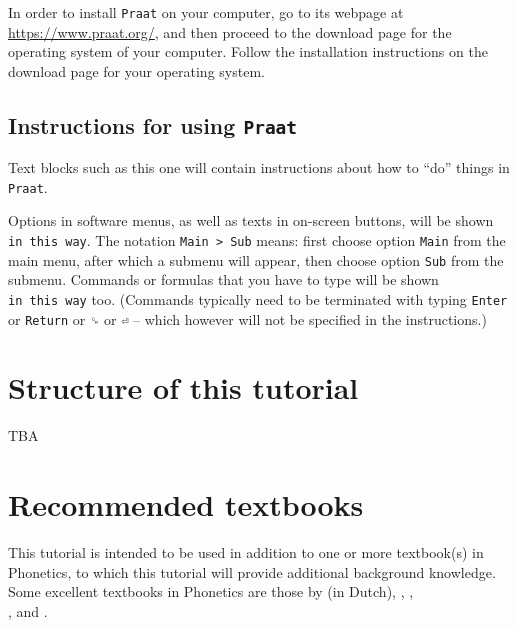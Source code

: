 \documentclass[
]{book}
\begin{document}
In order to install \texttt{Praat} on your computer, go to its webpage at \url{https://www.praat.org/}, and then proceed to the download page for the operating system of your computer. Follow the installation instructions on the download page for your operating system.

\label{tech-layout}
\subsection*{\texorpdfstring{Instructions for using \texttt{Praat}}{Instructions for using Praat}}\label{instructions-for-using-praat}

Text blocks such as this one will contain instructions about how to ``do'' things in \texttt{Praat}.

Options in software menus, as well as texts in on-screen buttons, will be shown \texttt{in\ this\ way}.
The notation \texttt{Main\ \textgreater{}\ Sub} means: first choose option \texttt{Main} from the main menu, after which a submenu will appear, then choose option \texttt{Sub} from the submenu.
Commands or formulas that you have to type will be shown \texttt{in\ this\ way} too. (Commands typically need to be terminated with typing \texttt{Enter} or \texttt{Return} or \texttt{␍} or \texttt{⏎} -- which however will not be specified in the instructions.)

\section*{Structure of this tutorial}\label{structure-of-this-tutorial}

TBA

\section*{Recommended textbooks}\label{recommended-textbooks}

This tutorial is intended to be used in addition to one or more textbook(s) in Phonetics, to which this tutorial will provide additional background knowledge. Some excellent textbooks in Phonetics are those by
\citet{Rietveld_VanHeuven_2009} (in Dutch),
\citet{Johnson_2011},
\citet{Ladefoged_Johnson_2015},\\
\citet{Reetz_Jongman_2020}, and
\citet{Zsiga_2024}.
\end{document}
